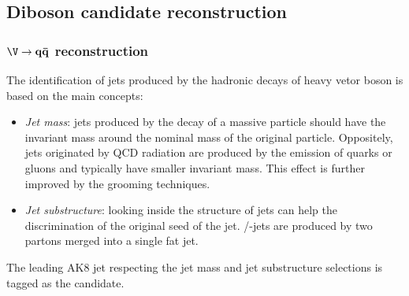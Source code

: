 \subsection{Diboson candidate reconstruction}
\label{ssec:final_dib_cand}

\subsubsection{$\mathbf{\V \rightarrow q \bar{q}}$ reconstruction}
\label{ssec:Vcand}
The identification of jets produced by the hadronic decays of heavy vetor boson is based on the main concepts:
\begin{itemize}
  \item \textit{Jet mass}: jets produced by the decay of a massive particle should have the invariant mass around the nominal mass of the original particle. Oppositely, jets originated by QCD radiation are produced by the emission of quarks or gluons and typically have smaller invariant mass. This effect is further improved by the grooming techniques.
  \item \textit{Jet substructure}: looking inside the structure of jets can help the discrimination of the original seed of the jet. \Z/\W-jets are produced by two partons merged into a single fat jet.
\end{itemize}

\noindent The leading AK8 jet respecting the jet mass and jet substructure selections is tagged as the \V candidate.

